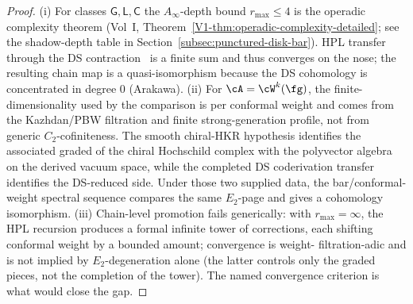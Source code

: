 \begin{proof}
(i) For classes $\mathsf{G},\mathsf{L},\mathsf{C}$ the $A_\infty$-depth
bound $r_{\max}\le 4$ is the operadic complexity theorem (Vol~I,
Theorem~\ref*{V1-thm:operadic-complexity-detailed}; see the shadow-depth
table in Section~\ref{subsec:punctured-disk-bar}). HPL transfer through
the DS contraction~\cite{Arakawa15} is a finite sum and thus converges
on the nose; the resulting chain map is a quasi-isomorphism because the
DS cohomology is concentrated in degree $0$ (Arakawa).
(ii) For $\cA=\cW^k(\fg)$, the finite-dimensionality used by the
comparison is per conformal weight and comes from the Kazhdan/PBW
filtration and finite strong-generation profile, not from generic
$C_2$-cofiniteness.  The smooth chiral-HKR hypothesis identifies the
associated graded of the chiral Hochschild complex with the
polyvector algebra on the derived vacuum space, while the completed
DS coderivation transfer identifies the DS-reduced side.  Under those
two supplied data, the bar/conformal-weight spectral sequence compares
the same \(E_2\)-page and gives a cohomology isomorphism.
(iii) Chain-level promotion fails generically: with $r_{\max}=\infty$,
the HPL recursion produces a formal infinite tower of corrections, each
shifting conformal weight by a bounded amount; convergence is weight-
filtration-adic and is not implied by $E_2$-degeneration alone (the
latter controls only the graded pieces, not the completion of the
tower). The named convergence criterion is what would close the gap.
\end{proof}

